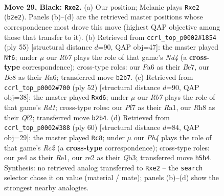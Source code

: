 \documentclass[11pt]{article}
\begin{document}
\clearpage

\begin{figure}[p]\centering
\begin{subfigure}{0.46\textwidth}\centering
\resizebox{\linewidth}{!}{%
\newchessgame
\chessboard[
  setfen={2bq3r/2n2pk1/p5p1/n1Q1p2p/P3P3/N1PP3N/Br2RPPP/R4K2 b - - 0 29},
  showmover=false,
  pgfstyle=straightmove, color=movearrow, markmove={b2-e2}
]}
\caption{}
\end{subfigure}\hfill
\begin{subfigure}{0.46\textwidth}\centering
\resizebox{\linewidth}{!}{%
\newchessgame
\chessboard[
  setfen={6k1/1q2bpp1/r6p/2pn3Q/p1Nn4/PrNP3P/1P4PB/2R2R1K b - - 1 28},
  showmover=false,
  pgfstyle=straightmove, color=movearrow, markmove={d5-f6}
]}
\caption{}
\end{subfigure}
\\[4pt]
\begin{subfigure}{0.46\textwidth}\centering
\resizebox{\linewidth}{!}{%
\newchessgame
\chessboard[
  setfen={3r4/2p3pk/2br3p/1pN1p2n/p1q1P3/2P1BP1P/1P3QPK/R2R4 w - - 8 27},
  showmover=false,
  pgfstyle=straightmove, color=movearrow, markmove={d1-d6}
]}
\caption{}
\end{subfigure}\hfill
\begin{subfigure}{0.46\textwidth}\centering
\resizebox{\linewidth}{!}{%
\newchessgame
\chessboard[
  setfen={rb1r4/1p4pk/pP4qp/P2npp2/1B6/1Q1P2NP/2R2PP1/4R1K1 w - - 7 31},
  showmover=false,
  pgfstyle=straightmove, color=movearrow, markmove={c2-c8}
]}
\caption{}
\end{subfigure}
\caption{\textbf{Move 29, Black: \texttt{Rxe2}.} (a) Our position; Melanie plays \texttt{Rxe2} (\texttt{b2e2}). Panels (b)--(d) are the retrieved master positions whose correspondence most drove this move (highest QAP objective among those that transfer to it). (b) Retrieved from \texttt{ccrl\_top\_p0002\#1854} (ply 55) [structural distance $d$=90, QAP obj=47]: the master played \texttt{Nf6}; under $\mu$ our \emph{Rb7} plays the role of that game's \emph{Nd4} (a \textbf{cross-type} correspondence); cross-type roles: our \emph{P}a6 as their \emph{B}e7, our \emph{B}c8 as their \emph{R}a6; transferred move \texttt{b2b7}. (c) Retrieved from \texttt{ccrl\_top\_p0002\#700} (ply 52) [structural distance $d$=90, QAP obj=38]: the master played \texttt{Rxd6}; under $\mu$ our \emph{Rb7} plays the role of that game's \emph{Rd1}; cross-type roles: our \emph{P}f7 as their \emph{R}a1, our \emph{R}h8 as their \emph{Q}f2; transferred move \texttt{b2b4}. (d) Retrieved from \texttt{ccrl\_top\_p0002\#388} (ply 60) [structural distance $d$=84, QAP obj=29]: the master played \texttt{Rc8}; under $\mu$ our \emph{Ph4} plays the role of that game's \emph{Rc2} (a \textbf{cross-type} correspondence); cross-type roles: our \emph{p}e4 as their \emph{R}e1, our \emph{r}e2 as their \emph{Q}b3; transferred move \texttt{h5h4}. Synthesis: no retrieved analog transferred to \texttt{Rxe2} -- the \texttt{search} selector chose it on value (material / mate); panels (b)--(d) show the strongest nearby analogies.}
\label{fig:thought-m57}
\end{figure}
\end{document}
